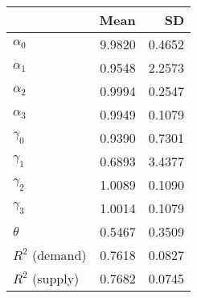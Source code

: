 
\begin{tabular}[t]{lrr}
\toprule
  & Mean & SD\\
\midrule
$\alpha_{0}$ & 9.9820 & 0.4652\\
$\alpha_{1}$ & 0.9548 & 2.2573\\
$\alpha_{2}$ & 0.9994 & 0.2547\\
$\alpha_{3}$ & 0.9949 & 0.1079\\
$\gamma_{0}$ & 0.9390 & 0.7301\\
$\gamma_{1}$ & 0.6893 & 3.4377\\
$\gamma_{2}$ & 1.0089 & 0.1090\\
$\gamma_{3}$ & 1.0014 & 0.1079\\
$\theta$ & 0.5467 & 0.3509\\
$R^{2}$ (demand) & 0.7618 & 0.0827\\
$R^{2}$ (supply) & 0.7682 & 0.0745\\
\bottomrule
\end{tabular}
